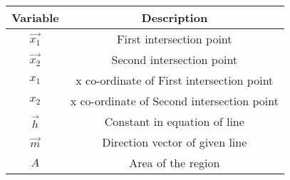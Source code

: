 \begin{tabular}[12pt]{ |c|c|}
    \hline
    \textbf{Variable} & \textbf{Description}\\ 
    \hline
    $\vec{x_1}$ & First intersection point\\
    \hline
    $\vec{x_2}$ & Second intersection point\\
    \hline
    $x_1$ & x co-ordinate of First intersection point\\
    \hline
    $x_2$ & x co-ordinate of Second intersection point\\
    \hline
    $\vec{h}$ & Constant in equation of line\\
    \hline
    $\vec{m}$ & Direction vector of given line\\
    \hline
    $A$ & Area of the region\\
    \hline
    \end{tabular}
